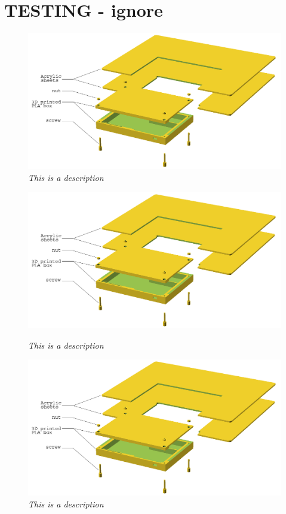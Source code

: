 \section{TESTING - ignore}

\begin{figure}[h]
\begin{center}
\includegraphics[scale=0.5]{figures/explode.png}
\caption{\small {\it {This is a description}}} \label{fig:explode}
\end{center}
\end{figure}


\begin{figure}[h]
\begin{minipage}[b]{7.5cm}
\centering
\includegraphics[scale=0.20]{figures/explode.png}
\caption{\small {\it {This is a description}}} \label{fig:testfig1}
\end{minipage}
\hspace{0.5cm}
\begin{minipage}[b]{7.5cm}
\centering
\includegraphics[scale=0.20]{figures/explode.png}
\caption{\small {\it {This is a description}}} \label{fig:testfig2}
\end{minipage}
\end{figure}


